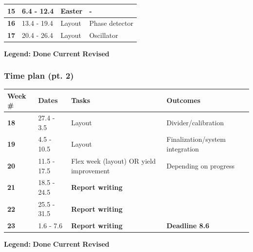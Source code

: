 \documentclass[t, screen, aspectratio=43]{beamer}
\begin{document}
\begin{frame}
\begin{table}[htb!]
\begin{tabular}{|l|l|l|l|}
			\hline 
			\rule[-1ex]{0pt}{2.5ex} \textbf{15}& 6.4 - 12.4& {\color{red}\textbf{Easter}} & - \\ 
			\hline 
			\rule[-1ex]{0pt}{2.5ex} \textbf{16}& 13.4 - 19.4& Layout & Phase detector\\ 
			\hline 
			\rule[-1ex]{0pt}{2.5ex} \textbf{17}& 20.4 - 26.4& Layout & Oscillator\\ 
			\hline 
		\end{tabular}
		\begin{flushleft}\textbf{Legend:} \colorbox{red!20}{\textbf{Done}} \colorbox{green!20}{\textbf{Current}}  \colorbox{blue!20}{\textbf{Revised}}
		\end{flushleft}
	\end{table}   
\end{frame}

\begin{frame}
	\frametitle{Time plan (pt. 2)}
	\begin{table}[htb!]
		\tiny
		\centering
		\vspace{-1em}
		\def\arraystretch{1.5}		
		\setlength\arrayrulewidth{0.75pt}
		\setlength{\tabcolsep}{1em} %
		\begin{tabular}{|l|l|l|l|}
			\hline 
			\rule[-1ex]{0pt}{2.5ex} \cellcolor{gray!40}\textbf{Week \#} & \cellcolor{gray!40}\textbf{Dates} &\cellcolor{gray!40}\textbf{Tasks} & \cellcolor{gray!40}\textbf{Outcomes}\\ 
			\hline 
			\rule[-1ex]{0pt}{2.5ex} \textbf{18}& 27.4 - 3.5 & Layout & Divider/calibration\\ 
			\hline 
			\rule[-1ex]{0pt}{2.5ex} \textbf{19}& 4.5 - 10.5 & Layout & Finalization/system integration\\ 
			\hline 
			\rule[-1ex]{0pt}{2.5ex} \textbf{20}& 11.5 - 17.5 & Flex week (layout) OR yield improvement & Depending on progress\\ 
			\hline 
			\rule[-1ex]{0pt}{2.5ex} \textbf{21}& 18.5 - 24.5& {\color{blue}\textbf{Report writing}} & \\ 
			\hline 
			\rule[-1ex]{0pt}{2.5ex} \textbf{22}& 25.5 - 31.5& {\color{blue}\textbf{Report writing}} & \\ 
			\hline 
			\rule[-1ex]{0pt}{2.5ex} \textbf{23}& 1.6 - 7.6& {\color{blue}\textbf{Report writing}} & {\color{red}\textbf{Deadline 8.6}}\\ 
			\hline 
		\end{tabular}
		\begin{flushleft}\textbf{Legend:} \colorbox{red!20}{\textbf{Done}} \colorbox{green!20}{\textbf{Current}}  \colorbox{blue!20}{\textbf{Revised}}
		\end{flushleft}
	\end{table}   
\end{frame}
\end{document}
